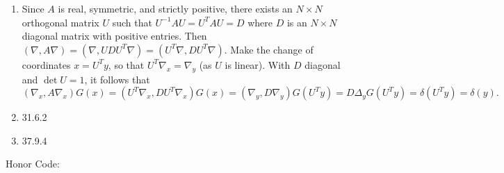 \documentclass[11pt]{article}
\begin{document}
\begin{enumerate}
    \item Since $A$ is real, symmetric, and strictly positive, there exists an $N\times N$ orthogonal matrix $U$ such that $U^{-1}AU = U^TAU = D$ where $D$ is an $N\times N$ diagonal matrix with positive entries. Then $(\nabla, A\nabla) = (\nabla, UDU^T\nabla) = (U^T\nabla, DU^T\nabla)$. Make the change of coordinates $x = U^Ty$, so that $U^T\nabla_x = \nabla_y$ (as $U$ is linear). With $D$ diagonal and $\det U = 1$, it follows that \[(\nabla_x, A\nabla_x)G(x) = (U^T\nabla_x, DU^T\nabla_x)G(x) = (\nabla_y, D\nabla_y)G(U^Ty) = D\Delta_yG(U^Ty) = \delta(U^Ty) = \delta(y).\]
    \item 31.6.2
    \item 37.9.4

    \hrulefill
\end{enumerate}
Honor Code: \vspace*{7em}
\end{document}
